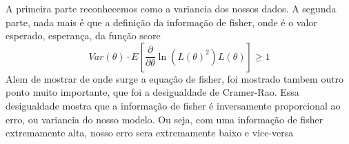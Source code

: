 A primeira parte reconhecemos como a variancia dos nossos dados. A segunda parte, nada mais é
que a definição da informação de fisher, onde é o valor esperado, esperança, da função score
\begin{equation}
    \label{eq:desigualdade de Cramer-Rao}
    Var(\theta ) \cdot E[\frac{\partial}{\partial \theta } \ln (L(\theta )^{2})L(\theta)]\geq 1 
\end{equation}
Alem de mostrar de onde surge a equação de fisher, foi mostrado tambem outro ponto muito importante,
que foi a desigualdade de Cramer-Rao. Essa desigualdade mostra que a informação de fisher é
inversamente proporcional ao erro, ou variancia do nosso modelo. Ou seja, com uma informação de
fisher extremamente alta, nosso erro sera extremamente baixo e vice-versa \par

